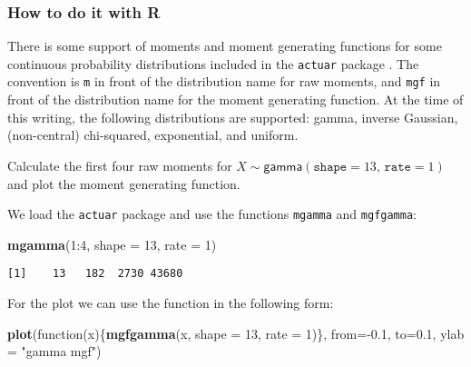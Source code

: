 \documentclass[]{book}
\newenvironment{Shaded}{\begin{snugshade}}{\end{snugshade}}
\newcommand{\KeywordTok}[1]{\textcolor[rgb]{0.13,0.29,0.53}{\textbf{{#1}}}}
\newcommand{\DataTypeTok}[1]{\textcolor[rgb]{0.13,0.29,0.53}{{#1}}}
\newcommand{\DecValTok}[1]{\textcolor[rgb]{0.00,0.00,0.81}{{#1}}}
\newcommand{\FloatTok}[1]{\textcolor[rgb]{0.00,0.00,0.81}{{#1}}}
\newcommand{\StringTok}[1]{\textcolor[rgb]{0.31,0.60,0.02}{{#1}}}
\newcommand{\NormalTok}[1]{{#1}}
\numberwithin{equation}{chapter}
\numberwithin{figure}{chapter}
\theoremstyle{plain}
\theoremstyle{definition}
\theoremstyle{remark}
\theoremstyle{definition}
\theoremstyle{definition}
\theoremstyle{remark}
\let\BeginKnitrBlock\begin \let\EndKnitrBlock\end
\begin{document}
\subsubsection{How to do it with R}\label{how-to-do-it-with-r-27}

There is some support of moments and moment generating functions for
some continuous probability distributions included in the
\texttt{actuar} package \autocite{actuar}. The convention is \texttt{m}
in front of the distribution name for raw moments, and \texttt{mgf} in
front of the distribution name for the moment generating function. At
the time of this writing, the following distributions are supported:
gamma, inverse Gaussian, (non-central) chi-squared, exponential, and
uniform.

\bigskip

\BeginKnitrBlock{example}
\protect\hypertarget{ex:unnamed-chunk-292}{}{\label{ex:unnamed-chunk-292}}Calculate
the first four raw moments for
\(X\sim\mathsf{gamma}(\mathtt{shape}=13,\,\mathtt{rate}=1)\) and plot
the moment generating function.
\EndKnitrBlock{example}

We load the \texttt{actuar} package and use the functions
\texttt{mgamma} and \texttt{mgfgamma}:

\begin{Shaded}
\begin{Highlighting}[]
\KeywordTok{mgamma}\NormalTok{(}\DecValTok{1}\NormalTok{:}\DecValTok{4}\NormalTok{, }\DataTypeTok{shape =} \DecValTok{13}\NormalTok{, }\DataTypeTok{rate =} \DecValTok{1}\NormalTok{)}
\end{Highlighting}
\end{Shaded}

\begin{verbatim}
[1]    13   182  2730 43680
\end{verbatim}

For the plot we can use the function in the following form:

\begin{Shaded}
\begin{Highlighting}[]
\KeywordTok{plot}\NormalTok{(function(x)\{}\KeywordTok{mgfgamma}\NormalTok{(x, }\DataTypeTok{shape =} \DecValTok{13}\NormalTok{, }\DataTypeTok{rate =} \DecValTok{1}\NormalTok{)\}, }
     \DataTypeTok{from=}\NormalTok{-}\FloatTok{0.1}\NormalTok{, }\DataTypeTok{to=}\FloatTok{0.1}\NormalTok{, }\DataTypeTok{ylab =} \StringTok{"gamma mgf"}\NormalTok{)}
\end{Highlighting}
\end{Shaded}
\end{document}
